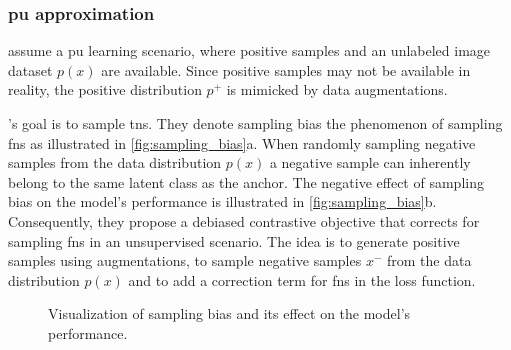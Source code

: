 \subsubsection{\ac{pu} approximation}\label{subsec:pu_approximation}

\citet{chuang_debiased_2020} assume a \ac{pu} learning scenario, 
where positive samples and an unlabeled image dataset $p(x)$ are available.
Since positive samples may not be available in reality, 
the positive distribution $p^+$ is mimicked by data augmentations.

\citeauthor{chuang_debiased_2020}'s goal is to sample \acp{tn}.
They denote sampling bias the phenomenon of sampling \acp{fn} as illustrated in \autoref{fig:sampling_bias}a.
When randomly sampling negative samples from the data distribution $p(x)$ 
a negative sample can inherently belong to the same latent class as the anchor.
The negative effect of sampling bias on the model's performance is illustrated in \autoref{fig:sampling_bias}b.
Consequently, they propose a debiased contrastive objective that corrects for sampling \acp{fn} 
in an unsupervised scenario.
The idea is to generate positive samples using augmentations,
to sample negative samples $x^-$ from the data distribution $p(x)$
and to add a correction term for \acp{fn} in the loss function.

\begin{figure}%
    \centering
    \qquad
    \caption{Visualization of sampling bias and its effect on the model's performance.}%
    \label{fig:sampling_bias}%
\end{figure}